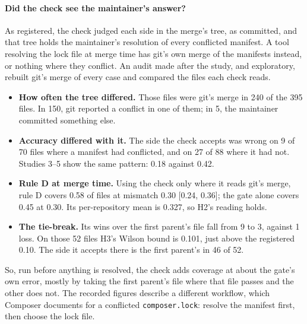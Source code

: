 \documentclass[11pt]{article}
\newcommand{\code}[1]{\texttt{#1}}
\begin{document}
\paragraph{Did the check see the maintainer's answer?}
As registered, the check judged each side in the merge's tree, as committed, and that tree
holds the maintainer's resolution of every conflicted manifest. A tool resolving the lock file
at merge time has git's own merge of the manifests instead, or nothing where they conflict. An
audit made after the study, and exploratory, rebuilt git's merge of every case and compared the
files each check reads.
\begin{itemize}
  \item \textbf{How often the tree differed.} Those files were git's merge in 240 of the 395
  files. In 150, git reported a conflict in one of them; in 5, the maintainer committed
  something else.
  \item \textbf{Accuracy differed with it.} The side the check accepts was wrong on 9 of 70
  files where a manifest had conflicted, and on 27 of 88 where it had not. Studies 3--5 show the
  same pattern: 0.18 against 0.42.
  \item \textbf{Rule D at merge time.} Using the check only where it reads git's merge, rule D
  covers 0.58 of files at mismatch 0.30 [0.24, 0.36]; the gate alone covers 0.45 at 0.30. Its
  per-repository mean is 0.327, so H2's reading holds.
  \item \textbf{The tie-break.} Its wins over the first parent's file fall from 9 to 3, against
  1 loss. On those 52 files H3's Wilson bound is 0.101, just above the registered 0.10. The
  side it accepts there is the first parent's in 46 of 52.
\end{itemize}
So, run before anything is resolved, the check adds coverage at about the gate's own error,
mostly by taking the first parent's file where that file passes and the other does not. The
recorded figures describe a different workflow, which Composer documents for a conflicted
\code{composer.lock}: resolve the manifest first, then choose the lock file.
\end{document}
